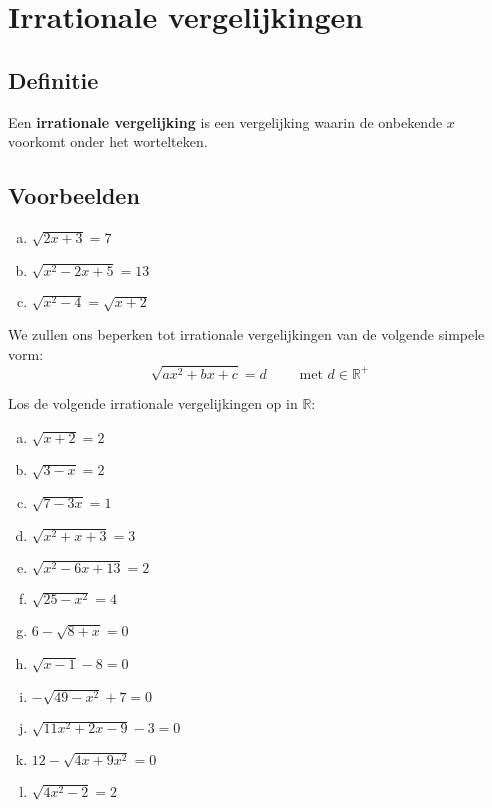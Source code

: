 \documentclass[12pt,twoside]{article}
\begin{document}
\begin{theorie}
  \thispagestyle{empty}
  \mbox{}
  \newpage
  \clearpage
  \thispagestyle{empty}
  \tableofcontents
  \newpage
  \clearpage

  \fancyhead[RE,LO]{}

\end{theorie}

\section{Irrationale vergelijkingen}

\begin{theorie}
  \subsection{Definitie}

  \begin{mdframed}
    Een {\bf irrationale vergelijking} is een vergelijking waarin de onbekende $x$ voorkomt onder het wortelteken.
  \end{mdframed}

  \subsection{Voorbeelden}
  \begin{enumerate}[(a)]
  \item $\sqrt{2x+3}=7$
  \item $\sqrt{x^2-2x+5}=13$
  \item $\sqrt{x^2-4}=\sqrt{x+2}$
  \end{enumerate}
  
  
  We zullen ons beperken tot irrationale vergelijkingen van de volgende simpele vorm:
  $$\sqrt{ax^2+bx+c}=d\qquad\mbox{ met } d\in\mathbb{R}^+$$


\end{theorie}

\begin{oefening}
Los de volgende irrationale vergelijkingen op in $\mathbb{R}$:
\begin{multicols}{2}
\begin{enumerate}[(a)]
  \item $\sqrt{x+2}=2$
  \item $\sqrt{3-x}=2$
  \item $\sqrt{7-3x}=1$
  \item $\sqrt{x^2+x+3}=3$
  \item $\sqrt{x^2-6x+13}=2$
  \item $\sqrt{25-x^2}=4$
  \item $6-\sqrt{8+x}=0$
  \item $\sqrt{x-1}-8=0$
  \item $-\sqrt{49-x^2}+7=0$
  \item $\sqrt{11x^2+2x-9}-3=0$
  \item $12-\sqrt{4x+9x^2}=0$
  \item $\sqrt{4x^2-2}=2$
\end{enumerate}
\end{multicols}
\end{oefening}
\end{document}
